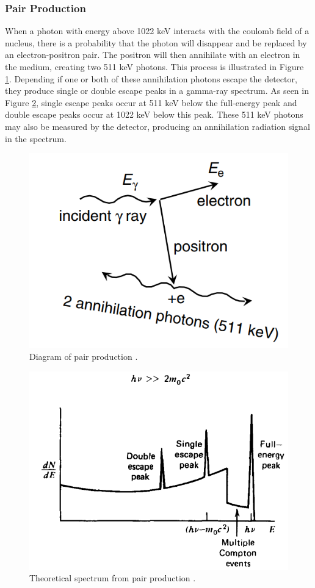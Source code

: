 \subsubsection{Pair Production}

When a photon with energy above 1022 keV interacts with the coulomb field of a nucleus, there is a probability that the photon will disappear and be replaced by an electron-positron pair. The positron will then annihilate with an electron in the medium, creating two 511 keV photons. This process is illustrated in Figure \ref{fig:pair_production}. Depending if one or both of these annihilation photons escape the detector, they produce single or double escape peaks in a gamma-ray spectrum. As seen in Figure \ref{fig:pair_production_spectra}, single escape peaks occur at 511 keV below the full-energy peak and double escape peaks occur at 1022 keV below this peak. These 511 keV photons may also be measured by the detector, producing an annihilation radiation signal in the spectrum.

\begin{figure}[H]
\centering
\includegraphics[width=0.6\linewidth]{images/pair_production}
\caption{Diagram of pair production \cite{gilmore}.}
\label{fig:pair_production}
\end{figure}

\begin{figure}[H]
\centering
\includegraphics[width=0.6\linewidth]{images/pair_production_spectra}
\caption{Theoretical spectrum from pair production \cite{knoll}.}
\label{fig:pair_production_spectra}
\end{figure}


